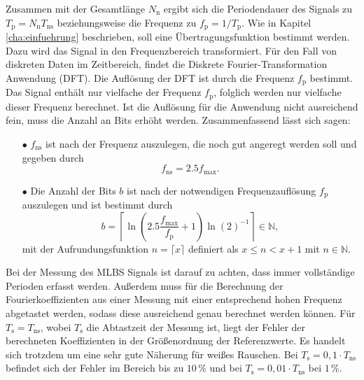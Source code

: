 \documentclass[12pt,report,final,twoside,accentcolor=tud9b,bigchapter]{tudreport}
\begin{document}
Zusammen mit der Gesamtlänge $N_\mathrm{n}$ ergibt sich die
Periodendauer des Signals zu $T_\mathrm{p}=N_\mathrm{n}T_\mathrm{ns}$
beziehungsweise die Frequenz zu $f_\mathrm{p}=1/T_\mathrm{p}$. Wie in
Kapitel \ref{cha:einfuehrung} beschrieben, soll eine
Übertragungsfunktion bestimmt werden.
Dazu wird das Signal in den Frequenzbereich transformiert. Für den Fall
von diskreten Daten im Zeitbereich, findet die Diskrete
Fourier-Transformation Anwendung (DFT). Die Auflösung der DFT ist durch
die Frequenz $f_\mathrm{p}$ bestimmt. Das Signal enthält nur vielfache der Frequenz $f_\mathrm{p}$, folglich werden nur vielfache dieser Frequenz berechnet. Ist die Auflösung für die Anwendung nicht
ausreichend fein, muss die Anzahl an Bits erhöht werden.
Zusammenfassend lässt sich sagen:
\begin{enumerate}
\item[$\bullet$] $f_\mathrm{ns}$ ist nach der Frequenz auszulegen, die noch gut angeregt werden soll und gegeben durch
\begin{equation}
f_\mathrm{ns} = 2.5f_{\mathrm{max}}.
\end{equation}
\item[$\bullet$] Die Anzahl der Bits $b$ ist nach der notwendigen Frequenzauflösung $f_\mathrm{p}$ auszulegen und ist bestimmt durch
\begin{equation}
b = \left\lceil \ln\left(2.5\frac{f_\mathrm{max}}{f_\mathrm{p}}+1\right)\ln(2)^{-1} \right\rceil \in \mathbb{N},
\end{equation}
mit der Aufrundungsfunktion $n=\lceil x \rceil$ definiert als $x \le n <x+1$ mit $n \in \mathbb{N}$.
\end{enumerate}
Bei der Messung des MLBS Signals ist darauf zu achten, dass immer
vollständige Perioden erfasst werden. Außerdem muss für die Berechnung
der Fourierkoeffizienten aus einer Messung mit einer entsprechend hohen
Frequenz abgetastet werden, sodass diese ausreichend genau berechnet werden können. Für $T_\mathrm{s} = T_{\mathrm{ns}}$, wobei $T_\mathrm{s}$ die Abtastzeit der Messung ist, liegt der
Fehler der berechneten Koeffizienten in der Größenordnung der
Referenzwerte. Es handelt sich trotzdem um eine sehr gute Näherung für
weißes Rauschen. Bei $T_\mathrm{s} = 0,1 \cdot T_{\mathrm{ns}}$ befindet
sich der Fehler im Bereich bis zu $10\,\%$ und bei $T_\mathrm{s} = 0,01
\cdot T_{\mathrm{ns}}$ bei $1\,\%$. \citep{skript, Isermann2011, Pintelon2001, Golomb2006}
\end{document}
